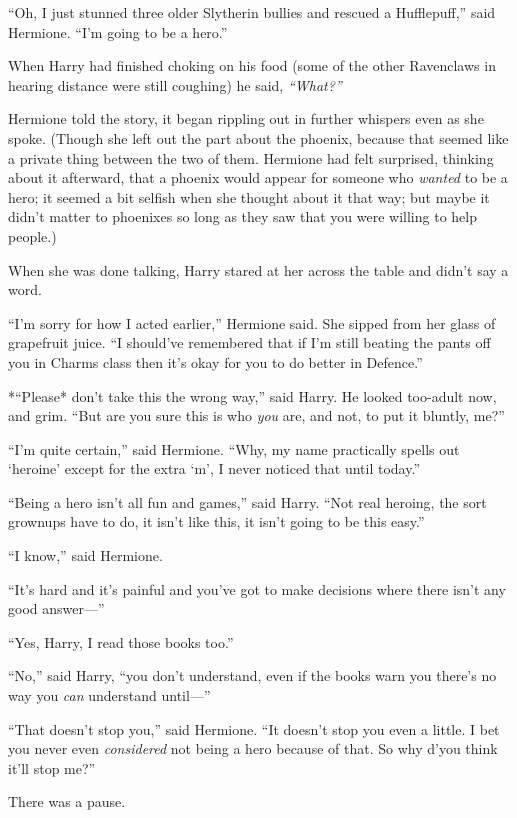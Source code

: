 ``Oh, I just stunned three older Slytherin bullies and rescued a
Hufflepuff,'' said Hermione. ``I'm going to be a hero.''

When Harry had finished choking on his food (some of the other
Ravenclaws in hearing distance were still coughing) he said,
\emph{``What?''}

Hermione told the story, it began rippling out in further whispers even
as she spoke. (Though she left out the part about the phoenix, because
that seemed like a private thing between the two of them. Hermione had
felt surprised, thinking about it afterward, that a phoenix would appear
for someone who \emph{wanted} to be a hero; it seemed a bit selfish when
she thought about it that way; but maybe it didn't matter to phoenixes
so long as they saw that you were willing to help people.)

When she was done talking, Harry stared at her across the table and
didn't say a word.

``I'm sorry for how I acted earlier,'' Hermione said. She sipped from
her glass of grapefruit juice. ``I should've remembered that if I'm
still beating the pants off you in Charms class then it's okay for you
to do better in Defence.''

*``Please* don't take this the wrong way,'' said Harry. He looked
too-adult now, and grim. ``But are you sure this is who \emph{you} are,
and not, to put it bluntly, me?''

``I'm quite certain,'' said Hermione. ``Why, my name practically spells
out `heroine' except for the extra `m', I never noticed that until
today.''

``Being a hero isn't all fun and games,'' said Harry. ``Not real
heroing, the sort grownups have to do, it isn't like this, it isn't
going to be this easy.''

``I know,'' said Hermione.

``It's hard and it's painful and you've got to make decisions where
there isn't any good answer---''

``Yes, Harry, I read those books too.''

``No,'' said Harry, ``you don't understand, even if the books warn you
there's no way you \emph{can} understand until---''

``That doesn't stop you,'' said Hermione. ``It doesn't stop you even a
little. I bet you never even \emph{considered} not being a hero because
of that. So why d'you think it'll stop me?''

There was a pause.

